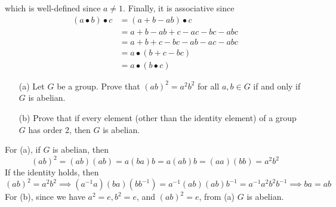 \begin{solution}
\begin{enumerate}
\begin{equation}
        \end{equation}
        which is well-defined since $a \neq 1$. Finally, it is associative since 
        \begin{align}
          (a \bullet b) \bullet c & = (a + b - ab) \bullet c \\
                                  & = a + b - ab + c - ac - bc - abc \\
                                  & = a + b + c - bc - ab - ac - abc \\
                                  & = a \bullet (b + c - bc) \\
                                  & = a \bullet (b \bullet c)
        \end{align}
    \end{enumerate}
  \end{solution}

  \begin{exercise}[Shifrin 6.1.10]
    \begin{enumerate}
      \item[(a)] Let $G$ be a group. Prove that $(ab)^2 = a^2b^2$ for all $a,b \in G$ if and only if $G$ is abelian.
      \item[(b)] Prove that if every element (other than the identity element) of a group $G$ has order 2, then $G$ is abelian.
    \end{enumerate}
  \end{exercise}
  \begin{solution}
    For (a), if $G$ is abelian, then 
    \begin{equation}
      (ab)^2 = (ab) (ab) = a (ba) b = a (ab) b = (aa) (bb) = a^2 b^2
    \end{equation}
    If the identity holds, then 
    \begin{equation}
      (ab)^2 = a^2 b^2 \implies (a^{-1} a) (ba) (b b^{-1}) = a^{-1} (ab)(ab) b^{-1} = a^{-1} a^2 b^2 b^{-1} \implies ba = ab
    \end{equation} 
    For (b), since we have $a^2 = e, b^2 = e$, and $(ab)^2 = e$, from (a) $G$ is abelian. 
  \end{solution}

